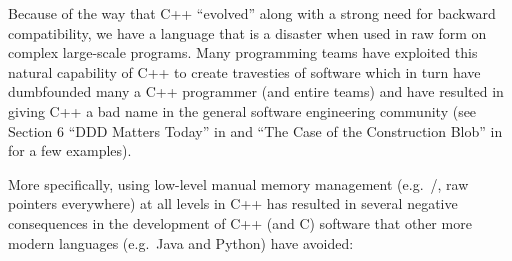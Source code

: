 \documentclass[pdf,ps2pdf,11pt]{SANDreport}
\begin{document}
Because of the way that C++ ``evolved'' along with a strong need for
backward compatibility, we have a language that is a disaster when
used in raw form on complex large-scale programs.  Many programming
teams have exploited this natural capability of C++ to create
travesties of software which in turn have dumbfounded many a C++
programmer (and entire teams) and have resulted in giving C++ a bad
name in the general software engineering community (see Section 6
``DDD Matters Today'' in {}\cite{DomainDrivenDesignQuickly} and ``The
Case of the Construction Blob'' in {}\cite[Chapter
9]{WorkingEffectivelyWithLegacyCode05} for a few examples).

More specifically, using low-level manual memory management (e.g.\
{}/{}, raw pointers everywhere) at all
levels in C++ has resulted in several negative consequences in the
development of C++ (and C) software that other more modern languages
(e.g.\ Java and Python) have avoided:
\end{document}
